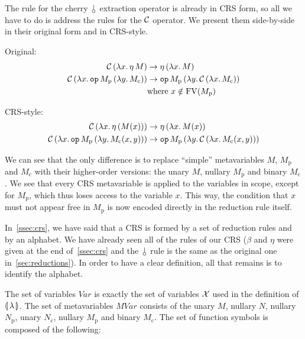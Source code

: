 The rule for the cherry $\cherry$ extraction operator is already in CRS
form, so all we have to do is address the rules for the $\mathcal{C}$ operator. We
present them side-by-side in their original form and in CRS-style.

Original:
\begin{align*}
  \mathcal{C}\,(\lambda x.\, \eta\,M) & \to \eta\,(\lambda x.\, M) \\
  \mathcal{C}\,(\lambda x.\, \mathtt{op}\,M_{\mathrm{p}}\,(\lambda y.\, M_{\mathrm{c}}))
  & \to
  \mathtt{op}\,M_{\mathrm{p}}\,(\lambda y.\, \mathcal{C}\,(\lambda x.\, M_{\mathrm{c}})) \\
  & \mathrm{where\ } x \notin \operatorname{FV}(M_{\mathrm{p}})
\end{align*}

CRS-style:
\begin{align*}
  \mathcal{C}\,(\lambda x.\, \eta\,(M(x))) & \to \eta\,(\lambda x.\, M(x)) \\
  \mathcal{C}\,(\lambda x.\, \mathtt{op}\,M_{\mathrm{p}}\,(\lambda y.\, M_{\mathrm{c}}(x,y)))
  & \to \mathtt{op}\,M_{\mathrm{p}}\,(\lambda y.\, \mathcal{C}\,(\lambda x.\, M_{\mathrm{c}}(x,y)))
\end{align*}

We can see that the only difference is to replace ``simple'' metavariables
$M$, $M_{\mathrm{p}}$ and $M_{\mathrm{c}}$ with their higher-order
versions: the unary $M$, nullary $M_{\mathrm{p}}$ and binary
$M_{\mathrm{c}}$. We see that every CRS metavariable is applied to the
variables in scope, except for $M_{\mathrm{p}}$, which thus loses access to
the variable $x$. This way, the condition that $x$ must not appear free in
$M_{\mathrm{p}}$ is now encoded directly in the reduction rule itself.

In~\ref{ssec:crs}, we have said that a CRS is formed by a set of reduction
rules and by an alphabet. We have already seen all of the rules of our CRS
($\beta$ and $\eta$ were given at the end of~\ref{ssec:crs} and the
$\cherry$ rule is the same as the original one in~\ref{sec:reductions}). In
order to have a clear definition, all that remains is to identify the
alphabet.

The set of variables $Var$ is exactly the set of variables $\mathcal{X}$ used in
the definition of $\llparenthesis \, \lambda \, \rrparenthesis$. The set of metavariables $MVar$
consists of the unary $M$, nullary $N$, nullary $N_{\mathrm{p}}$, unary
$N_{\mathrm{c}}$, nullary $M_{\mathrm{p}}$ and binary $M_{\mathrm{c}}$. The
set of function symbols is composed of the following:

